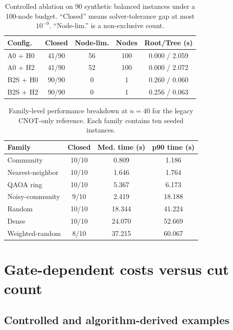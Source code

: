 \documentclass[
  aps,
  pra,
  reprint,
  amsmath,
  amssymb,
  longbibliography,
  nofootinbib,
  floatfix
]{revtex4-2}
\theoremstyle{plain}
\newcommand{\tabfit}[1]{{\footnotesize #1}}
\begin{document}
\begin{table}[tbp]
\centering
\caption{Controlled ablation on 90 synthetic balanced instances under a 100-node budget. ``Closed'' means solver-tolerance gap at most $10^{-9}$. ``Node-lim.'' is a non-exclusive count.}
\label{tab:ablation}
\tabfit{%
\begin{tabular*}{\columnwidth}{@{\extracolsep{\fill}}lcccc@{}}
\toprule
\textbf{Config.} & \textbf{Closed} & \textbf{Node-lim.} & \textbf{Nodes} & \textbf{Root/Tree (s)}\\
\midrule
A0 + H0   & 41/90 & 56 & 100 & 0.000 / 2.059\\
A0 + H2            & 41/90 & 52 & 100 & 0.000 / 2.072\\
B2S + H0       & 90/90 &  0 &   1 & 0.260 / 0.060\\
B2S + H2       & 90/90 &  0 &   1 & 0.256 / 0.063\\
\bottomrule
\end{tabular*}
}
\end{table}

\begin{table}[tbp]
\centering
\caption{Family-level performance breakdown at $n = 40$ for the legacy CNOT-only reference. Each family contains ten seeded instances.}
\label{tab:n40}
\tabfit{%
\begin{tabular*}{\columnwidth}{@{\extracolsep{\fill}}lccc@{}}
\toprule
\textbf{Family} & \textbf{Closed} & \textbf{Med. time (s)} & \textbf{p90 time (s)}\\
\midrule
Community        & 10/10 &  0.809 &  1.186\\
Nearest-neighbor & 10/10 &  1.646 &  1.764\\
QAOA ring        & 10/10 &  5.367 &  6.173\\
Noisy-community  &  9/10 &  2.419 & 18.188\\
Random           & 10/10 & 18.344 & 41.224\\
Dense            & 10/10 & 24.070 & 52.669\\
Weighted-random  &  8/10 & 37.215 & 60.067\\
\bottomrule
\end{tabular*}
}
\end{table}
\FloatBarrier

\section{Gate-dependent costs versus cut count}
\label{app:countqpd}

\subsection{Controlled and algorithm-derived examples}
\label{sec:results-count}
\end{document}
